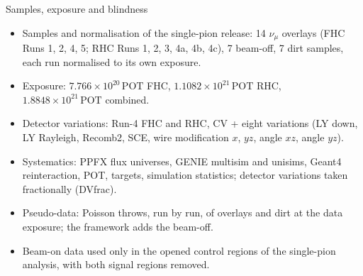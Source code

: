 \documentclass[aspectratio=169,10pt]{beamer}
\newcommand{\pot}{\,\text{POT}}
\begin{document}
\begin{frame}{Samples, exposure and blindness}
  \begin{itemize}\small\setlength\itemsep{3pt}
    \item Samples and normalisation of the single-pion release: 14 $\nu_\mu$ overlays (FHC Runs 1, 2, 4, 5;
          RHC Runs 1, 2, 3, 4a, 4b, 4c), 7 beam-off, 7 dirt samples, each run normalised to its own exposure.
    \item Exposure: $7.766\times10^{20}\pot$ FHC, $1.1082\times10^{21}\pot$ RHC, $1.8848\times10^{21}\pot$ combined.
    \item Detector variations: Run-4 FHC and RHC, CV + eight variations (LY down, LY Rayleigh,
          Recomb2, SCE, wire modification $x$, $yz$, angle $xz$, angle $yz$).
    \item Systematics: PPFX flux universes, GENIE multisim and unisims, Geant4 reinteraction, POT,
          targets, simulation statistics; detector variations taken fractionally (DVfrac).
    \item Pseudo-data: Poisson throws, run by run, of overlays and dirt at the data exposure; the
          framework adds the beam-off.
    \item Beam-on data used only in the opened control regions of the single-pion analysis, with both
          signal regions removed.
  \end{itemize}
  \vspace{2mm}
  \begin{center}
  \end{center}
\end{frame}
\end{document}
